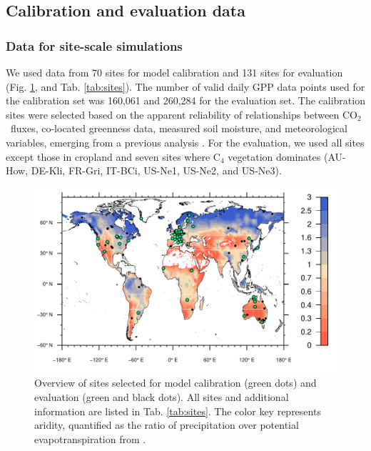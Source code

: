 \documentclass[gmd, manuscript]{copernicus}
\newcommand{\coo}{CO$_2$}
\begin{document}
\subsection{Calibration and evaluation data}

\label{sec:calibdata}

\subsubsection{Data for site-scale simulations}

We used data from 70 sites for model calibration and 131 sites for evaluation (Fig. \ref{fig:map_sites}, and Tab. \ref{tab:sites}). The number of valid daily GPP data points used for the calibration set was 160,061 and 260,284 for the evaluation set. The calibration sites were selected based on the apparent reliability of relationships between \coo\ fluxes, co-located greenness data, measured soil moisture, and meteorological variables, emerging from a previous analysis \citep{stocker18newphyt}. For the evaluation, we used all sites except those in cropland and seven sites where  C$_4$ vegetation dominates (AU-How, DE-Kli, FR-Gri, IT-BCi, US-Ne1, US-Ne2, and US-Ne3).

\begin{figure}[t]
    \centering
    \includegraphics[width=12cm]{fig/map_sites.pdf}
    \caption{Overview of sites selected for model calibration (green dots) and evaluation (green and black dots). All sites and additional information are listed in Tab. \ref{tab:sites}. The color key represents aridity, quantified as the ratio of precipitation over potential evapotranspiration from \citet{greve14}.}
    \label{fig:map_sites}
\end{figure}

\label{sec:sites}
\end{document}

